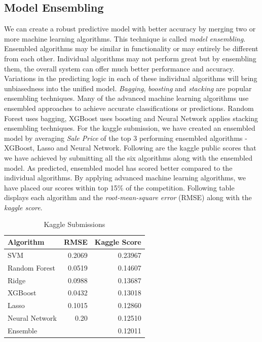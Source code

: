 \documentclass[sigconf]{acmart}
\begin{document}
	\subsection{Model Ensembling}
	We can create a robust predictive model with better accuracy by merging two or more machine learning algorithms. This technique is called {\em model ensembling}. Ensembled algorithms may be similar in functionality or may entirely be different from each other. Individual algorithms may not perform great but by ensembling them, the overall system can offer much better performance and accuracy. Variations in the predicting logic in each of these individual algorithms will bring unbiasedness into the unified model. {\em Bagging}, {\em boosting} and {\em stacking} are popular ensembling techniques. Many of the advanced machine learning algorithms use ensembled approaches to achieve accurate classifications or predictions. Random Forest uses bagging, XGBoost uses boosting and Neural Network applies stacking ensembling techniques. For the kaggle submission, we have created an ensembled model by averaging {\em Sale Price} of the top 3 performing ensembled algorithms - XGBoost, Lasso and Neural Network.  Following are the kaggle public scores that we have achieved by submitting all the six algorithms along with the ensembled model. As predicted, ensembled model has scored better compared to the individual algorithms. By applying advanced machine learning algorithms, we have placed our scores within top 15\% of the competition. Following table displays each algorithm and the {\em root-mean-square error} (RMSE) along with the {\em kaggle score}.
	
	\begin{table}[H]
		\caption{Kaggle Submissions}
		\label{tab:kaggle}		
		\begin{tabular}{lrr}
			\toprule
			Algorithm & RMSE & Kaggle Score \\
			\midrule
			SVM &  0.2069 & 0.23967 \\
			Random Forest &  0.0519 & 0.14607 \\
			Ridge &  0.0988 & 0.13687 \\
			XGBoost &  0.0432 & 0.13018 \\					
			Lasso &  0.1015 & 0.12860 \\
			Neural Network &  0.20 & 0.12510 \\
			Ensemble &   & 0.12011 \\
			\bottomrule
		\end{tabular}
	\end{table}
	
\end{document}
